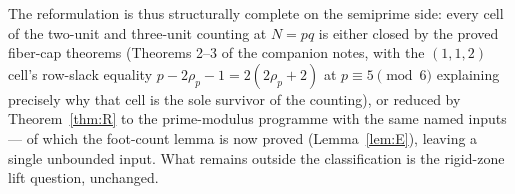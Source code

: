 The reformulation is thus structurally complete on the semiprime side: every
cell of the two-unit and three-unit counting at $N=pq$ is either closed by
the proved fiber-cap theorems (Theorems 2--3 of the companion notes, with the
$(1,1,2)$ cell's row-slack equality $p-2\rho_p-1=2(2\rho_p+2)$ at
$p\equiv5\pmod6$ explaining precisely why that cell is the sole survivor of
the counting), or reduced by Theorem~\ref{thm:R} to the prime-modulus
programme with the same named inputs --- of which the foot-count lemma is
now proved (Lemma~\ref{lem:E}), leaving a single unbounded input. What
remains outside the
classification is the rigid-zone lift question, unchanged.
